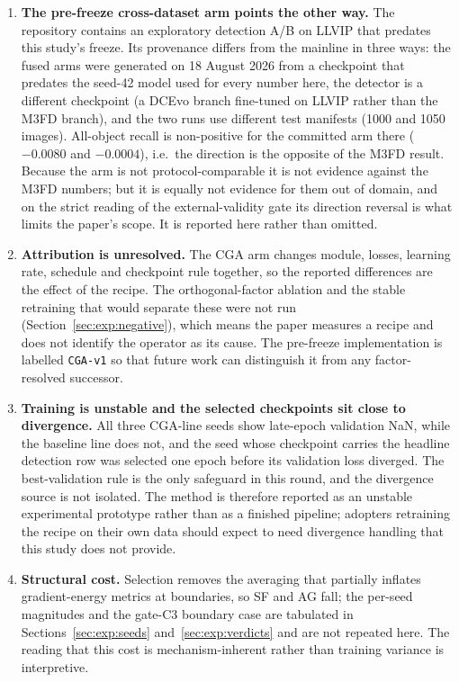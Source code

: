\documentclass[pdflatex,sn-mathphys-num]{sn-jnl}
\theoremstyle{thmstyleone}%
\theoremstyle{thmstyletwo}%
\theoremstyle{thmstylethree}%
\begin{document}
\begin{enumerate}
\item \textbf{The pre-freeze cross-dataset arm points the other way.} The repository contains an exploratory detection A/B on LLVIP that predates this study's freeze. Its provenance differs from the mainline in three ways: the fused arms were generated on 18 August 2026 from a checkpoint that predates the seed-42 model used for every number here, the detector is a different checkpoint (a DCEvo branch fine-tuned on LLVIP rather than the M3FD branch), and the two runs use different test manifests (1000 and 1050 images). All-object recall is non-positive for the committed arm there ($-0.0080$ and $-0.0004$), i.e.\ the direction is the opposite of the M3FD result. Because the arm is not protocol-comparable it is not evidence against the M3FD numbers; but it is equally not evidence for them out of domain, and on the strict reading of the external-validity gate its direction reversal is what limits the paper's scope. It is reported here rather than omitted.

\item \textbf{Attribution is unresolved.} The CGA arm changes module, losses, learning rate, schedule and checkpoint rule together, so the reported differences are the effect of the recipe. The orthogonal-factor ablation and the stable retraining that would separate these were not run (Section~\ref{sec:exp:negative}), which means the paper measures a recipe and does not identify the operator as its cause. The pre-freeze implementation is labelled \texttt{CGA-v1} so that future work can distinguish it from any factor-resolved successor.

\item \textbf{Training is unstable and the selected checkpoints sit close to divergence.} All three CGA-line seeds show late-epoch validation NaN, while the baseline line does not, and the seed whose checkpoint carries the headline detection row was selected one epoch before its validation loss diverged. The best-validation rule is the only safeguard in this round, and the divergence source is not isolated. The method is therefore reported as an unstable experimental prototype rather than as a finished pipeline; adopters retraining the recipe on their own data should expect to need divergence handling that this study does not provide.

\item \textbf{Structural cost.} Selection removes the averaging that partially inflates gradient-energy metrics at boundaries, so SF and AG fall; the per-seed magnitudes and the gate-C3 boundary case are tabulated in Sections~\ref{sec:exp:seeds} and~\ref{sec:exp:verdicts} and are not repeated here. The reading that this cost is mechanism-inherent rather than training variance is interpretive.


\end{enumerate}
\end{document}
